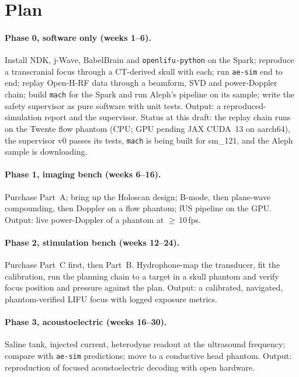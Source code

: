 \documentclass[11pt,a4paper]{article}
\begin{document}
\section{Plan}

\paragraph{Phase 0, software only (weeks 1--6).} Install NDK, j-Wave, BabelBrain and \texttt{openlifu-python} on the Spark; reproduce a transcranial focus through a CT-derived skull with each; run \texttt{ae-sim} end to end; replay Open-H-RF data through a beamform, SVD and power-Doppler chain; build \texttt{mach} for the Spark and run Aleph's pipeline on its sample; write the safety supervisor as pure software with unit tests. Output: a reproduced-simulation report and the supervisor. Status at this draft: the replay chain runs on the Twente flow phantom (CPU; GPU pending JAX CUDA~13 on aarch64), the supervisor v0 passes its tests, \texttt{mach} is being built for sm\_121, and the Aleph sample is downloading.

\paragraph{Phase 1, imaging bench (weeks 6--16).} Purchase Part~A; bring up the Holoscan design; B-mode, then plane-wave compounding, then Doppler on a flow phantom; fUS pipeline on the GPU. Output: live power-Doppler of a phantom at $\geq$\,10\,fps.

\paragraph{Phase 2, stimulation bench (weeks 12--24).} Purchase Part~C first, then Part~B. Hydrophone-map the transducer, fit the calibration, run the planning chain to a target in a skull phantom and verify focus position and pressure against the plan. Output: a calibrated, navigated, phantom-verified LIFU focus with logged exposure metrics.

\paragraph{Phase 3, acoustoelectric (weeks 16--30).} Saline tank, injected current, heterodyne readout at the ultrasound frequency; compare with \texttt{ae-sim} predictions; move to a conductive head phantom. Output: reproduction of focused acoustoelectric decoding with open hardware.
\end{document}
